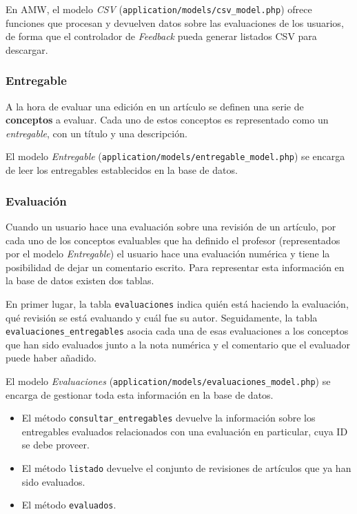 \documentclass[11pt]{article}
\begin{document}
En AMW, el modelo \textit{CSV} (\texttt{application/models/csv\_model.php})
ofrece funciones que procesan y devuelven datos sobre las evaluaciones de los
usuarios, de forma que el controlador de \textit{Feedback} pueda generar
listados CSV para descargar.

\subsubsection{Entregable}

A la hora de evaluar una edición en un artículo se definen una serie de
\textbf{conceptos} a evaluar. Cada uno de estos conceptos es representado como
un \textit{entregable}, con un título y una descripción.

El modelo \textit{Entregable}
(\texttt{application/models/entregable\_model.php}) se encarga de leer los
entregables establecidos en la base de datos.

\subsubsection{Evaluación}

Cuando un usuario hace una evaluación sobre una revisión de un artículo, por
cada uno de los conceptos evaluables que ha definido el profesor (representados
por el modelo \textit{Entregable}) el usuario hace una evaluación numérica y
tiene la posibilidad de dejar un comentario escrito. Para representar esta
información en la base de datos existen dos tablas. 

En primer lugar, la tabla \texttt{evaluaciones} indica quién está haciendo la
evaluación, qué revisión se está evaluando y cuál fue su autor. Seguidamente, la
tabla \texttt{evaluaciones\_entregables} asocia cada una de esas evaluaciones a
los conceptos que han sido evaluados junto a la nota numérica y el comentario
que el evaluador puede haber añadido.

El modelo \textit{Evaluaciones}
(\texttt{application/models/evaluaciones\_model.php}) se encarga de gestionar
toda esta información en la base de datos. 

\begin{itemize}
\item El método \texttt{consultar\_entregables} devuelve la información sobre
  los entregables evaluados relacionados con una evaluación en particular, cuya
  ID se debe proveer.
\item El método \texttt{listado} devuelve el conjunto de revisiones de artículos
  que ya han sido evaluados.
\item El método \texttt{evaluados}.
\end{itemize}
\end{document}
